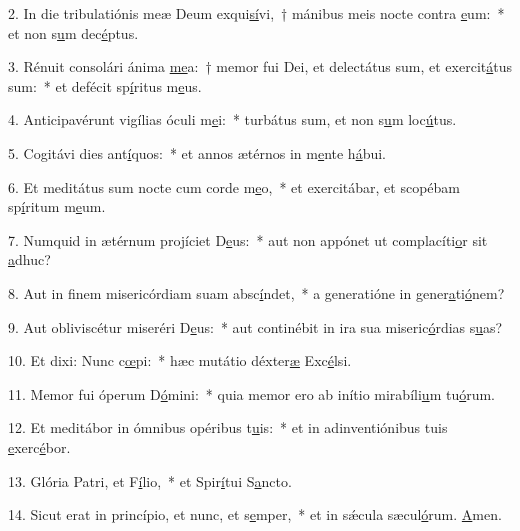 2. In die tribulatiónis meæ Deum exqui\uline{sí}vi,~† mánibus meis nocte contra \uline{e}um:~* et non s\uline{u}m dec\uline{é}ptus.\par 
3. Rénuit consolári ánima \uline{me}a:~† memor fui Dei, et delectátus sum, et exercit\uline{á}tus sum:~* et defécit sp\uline{í}ritus m\uline{e}us.\par 
4. Anticipavérunt vigílias óculi m\uline{e}i:~* turbátus sum, et non s\uline{u}m loc\uline{ú}tus.\par 
5. Cogitávi dies ant\uline{í}quos:~* et annos ætérnos in m\uline{e}nte h\uline{á}bui.\par 
6. Et meditátus sum nocte cum corde m\uline{e}o,~* et exercitábar, et scopébam sp\uline{í}ritum m\uline{e}um.\par 
7. Numquid in ætérnum projíciet D\uline{e}us:~* aut non appónet ut complacíti\uline{o}r sit \uline{a}dhuc?\par 
8. Aut in finem misericórdiam suam absc\uline{í}ndet,~* a generatióne in gener\uline{a}ti\uline{ó}nem?\par 
9. Aut obliviscétur miseréri D\uline{e}us:~* aut continébit in ira sua miseric\uline{ó}rdias s\uline{u}as?\par 
10. Et dixi: Nunc c\uline{œ}pi:~* hæc mutátio déxter\uline{æ} Exc\uline{é}lsi.\par 
11. Memor fui óperum D\uline{ó}mini:~* quia memor ero ab inítio mirabíli\uline{u}m tu\uline{ó}rum.\par 
12. Et meditábor in ómnibus opéribus t\uline{u}is:~* et in adinventiónibus tuis \uline{e}xerc\uline{é}bor.\par 
13. Glória Patri, et F\uline{í}lio,~* et Spir\uline{í}tui S\uline{a}ncto.\par 
14. Sicut erat in princípio, et nunc, et s\uline{e}mper,~* et in sǽcula sæcul\uline{ó}rum. \uline{A}men.\par 
